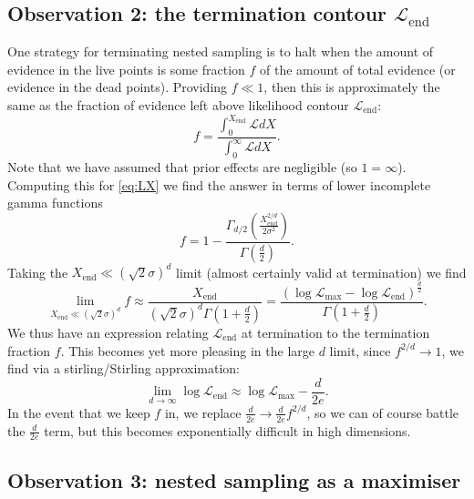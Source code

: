 \documentclass[usenatbib]{mnras} %
\begin{document}
\subsection*{Observation 2: the termination contour $\mathcal{L}_\mathrm{end}$}

One strategy for terminating nested sampling is to halt when the amount of evidence in the live points is some fraction $f$ of the amount of total evidence (or evidence in the dead points). Providing $f\ll 1$, then this is approximately the same as the fraction of evidence left above likelihood contour $\mathcal{L}_\mathrm{end}$:
\begin{equation}
    f = \frac{\int_0^{X_\mathrm{end}} \mathcal{L} dX}{\int_0^\infty \mathcal{L} dX}.
    \label{eq:fint}
\end{equation}
Note that we have assumed that prior effects are negligible (so $1=\infty$).
Computing this for \cref{eq:LX} we find the answer in terms of lower incomplete gamma functions
\begin{equation}
    f = 1- \frac{\Gamma_{d/2}(\frac{X_\mathrm{end}^{2/d}}{2\sigma^2})}{\Gamma(\frac{d}{2})}.
    \label{eq:f}
\end{equation}
Taking the $X_\mathrm{end}\ll (\sqrt{2}\sigma)^d$ limit (almost certainly valid at termination) we find
\begin{equation}
    \lim_{X_\mathrm{end}\ll (\sqrt{2}\sigma)^d} f \approx \frac{X_\mathrm{end}}{(\sqrt{2}\sigma)^d\Gamma(1+\frac{d}{2})} = \frac{(\log\mathcal{L}_\mathrm{max}-\log\mathcal{L}_\mathrm{end})^{\frac{d}{2}}}{\Gamma(1+\frac{d}{2})}.
\end{equation}
We thus have an expression relating $\mathcal{L}_\mathrm{end}$ at termination to the termination fraction $f$. This becomes yet more pleasing in the large $d$ limit, since $f^{2/d}\to 1$, we find via a stirling/Stirling approximation:
\begin{equation}
    \lim_{d\to\infty} \log\mathcal{L}_\mathrm{end} \approx \log\mathcal{L}_\mathrm{max} - \frac{d}{2e}.
\end{equation}
In the event that we keep $f$ in, we replace $\frac{d}{2e}\to \frac{d}{2e}f^{2/d}$, so we can of course battle the $\frac{d}{2e}$ term, but this becomes exponentially difficult in high dimensions.

\subsection*{Observation 3: nested sampling as a maximiser}
\end{document}
